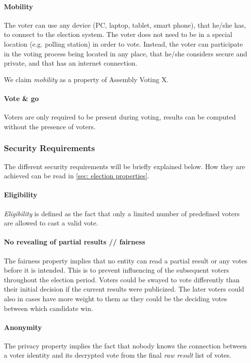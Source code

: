 \paragraph{Mobility}
The voter can use any device (PC, laptop, tablet, smart phone), that he/she has, to connect to the election system. The voter does not need to be in a special location (e.g. polling station) in order to vote. Instead, the voter can participate in the voting process being located in any place, that he/she considers secure and private, and that has an internet connection. 

We claim \textit{mobility} as a property of Assembly Voting X.

\paragraph{Vote \& go}
Voters are only required to be present during voting, results can be computed without the presence of voters.


\subsubsection{Security Requirements} \label{sec: security requirements}

The different security requirements will be briefly explained below. How they are achieved can be read in \cref{sec: election properties}.

\paragraph{Eligibility}
\textit{Eligibility} is defined as the fact that only a limited number of predefined voters are allowed to cast a valid vote. 

\paragraph{No revealing of partial results // fairness}
The fairness property implies that no entity can read a partial result or any votes before it is intended. This is to prevent influencing of the subsequent voters throughout the election period. Voters could be swayed to vote differently than their initial decision if the current results were publicized. The later voters could also in cases have more weight to them as they could be the deciding votes between which candidate win.

\paragraph{Anonymity}
The privacy property implies the fact that nobody knows the connection between a voter identity and its decrypted vote from the final \textit{raw result} list of votes.

